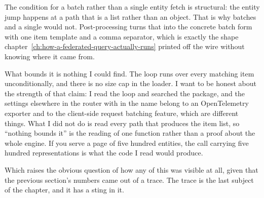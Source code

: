 %
The condition for a batch rather than a single entity fetch is structural: the
entity jump happens at a path that is a list rather than an object. That is why
 batches and a single  would not.
Post-processing turns that into the concrete batch form with one item template
and a comma separator, which is exactly the shape
chapter~\ref{ch:how-a-federated-query-actually-runs} printed off the wire
without knowing where it came from.

%
What bounds it is nothing I could find. The loop runs over every matching item
unconditionally, and there is no size cap in the loader. I want to be honest
about the strength of that claim: I read the loop and searched the package, and
the settings elsewhere in the router with  in the name belong to
an OpenTelemetry exporter and to the client-side request batching feature, which
are different things. What I did not do is read every path that produces the
item list, so \enquote{nothing bounds it} is the reading of one function rather
than a proof about the whole engine. If you serve a page of five hundred
entities, the  call carrying five hundred representations is
what the code I read would produce.

\medskip
Which raises the obvious question of how any of this was visible at all, given
that the previous section's numbers came out of a trace. The trace is the last
subject of the chapter, and it has a sting in it.

%
